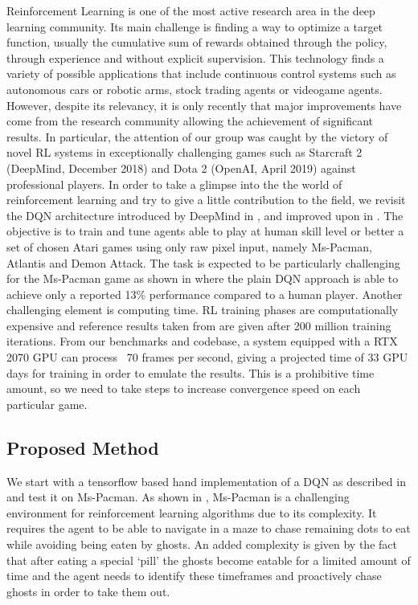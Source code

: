 \documentclass[10pt,twocolumn,letterpaper]{article}
\begin{document}
Reinforcement Learning is one of the most active research area in the deep learning community. Its main challenge is finding a way to optimize a target function, usually the cumulative sum of rewards obtained through the policy, through experience and without explicit supervision. This technology finds a variety of possible applications that include continuous control systems such as autonomous cars or robotic arms, stock trading agents or videogame agents. However, despite its relevancy, it is only recently that major improvements have come from the research community allowing the achievement of significant results.
In particular, the attention of our group was caught by the victory of novel RL systems in exceptionally challenging games such as Starcraft 2 (DeepMind, December 2018) and Dota 2 (OpenAI, April 2019) against professional players. In order to take a glimpse into the the world of reinforcement learning and try to give a little contribution to the field, we revisit the DQN architecture introduced by DeepMind in \cite{DBLP:journals/corr/MnihKSGAWR13}, and improved upon in \cite{DBLP:journals/corr/abs-1710-02298}. The objective is to train and tune agents able to play at human skill level or better a set of chosen Atari games using only raw pixel input, namely Ms-Pacman, Atlantis and Demon Attack. The task is expected to be particularly challenging for the Ms-Pacman game as shown in \cite{humancontrol} where the plain DQN approach is able to achieve only a reported 13\% performance compared to a human player.
Another challenging element is computing time. RL training phases are computationally expensive and reference results taken from \cite{DBLP:journals/corr/abs-1710-02298} are given after 200 million training iterations. From our benchmarks and codebase, a system equipped with a RTX 2070 GPU can process ~70 frames per second, giving a projected time of 33 GPU days for training in order to emulate the results. This is a prohibitive time amount, so we need to take steps to increase convergence speed on each particular game.


\subsection{Proposed Method}

We start with a tensorflow based hand implementation of a DQN as described in \cite{DBLP:journals/corr/MnihKSGAWR13} and test it on Ms-Pacman. As shown in \cite{humancontrol}, Ms-Pacman is a challenging environment for reinforcement learning algorithms due to its complexity. It requires the agent to be able to navigate in a maze to chase remaining dots to eat while avoiding being eaten by ghosts. An added complexity is given by the fact that after eating a special `pill' the ghosts become eatable for a limited amount of time and the agent needs to identify these timeframes and proactively chase ghosts in order to take them out.
\end{document}
